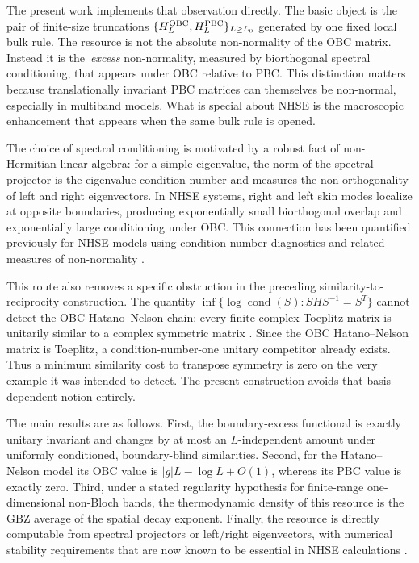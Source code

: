 \documentclass[reprint,amsmath,amssymb,aps,nofootinbib]{revtex4-2}
\newcommand{\cond}{\operatorname{cond}}
\begin{document}
The present work implements that observation directly. The basic object is
the pair of finite-size truncations \(\{H_L^{\rm OBC},H_L^{\rm PBC}\}_{L\ge L_0}\)
generated by one fixed local bulk rule. The resource is not the absolute
non-normality of the OBC matrix. Instead it is the \,\emph{excess}
non-normality, measured by biorthogonal spectral conditioning, that appears
under OBC relative to PBC. This distinction matters because translationally
invariant PBC matrices can themselves be non-normal, especially in
multiband models. What is special about NHSE is the macroscopic enhancement
that appears when the same bulk rule is opened.

The choice of spectral conditioning is motivated by a robust fact of
non-Hermitian linear algebra: for a simple eigenvalue, the norm of the
spectral projector is the eigenvalue condition number and measures the
non-orthogonality of left and right eigenvectors. In NHSE systems, right and
left skin modes localize at opposite boundaries, producing exponentially
small biorthogonal overlap and exponentially large conditioning under OBC.
This connection has been quantified previously for NHSE models using
condition-number diagnostics and related measures of non-normality
\cite{NakaiEtAl2024,FengEtAl2025}.

This route also removes a specific obstruction in the preceding
similarity-to-reciprocity construction. The quantity
\(
\inf\{\log\cond(S):SHS^{-1}=S^T\}
\)
cannot detect the OBC Hatano--Nelson chain: every finite complex Toeplitz
matrix is unitarily similar to a complex symmetric matrix
\cite{ChienLiuNakazatoTam}. Since the OBC Hatano--Nelson matrix is Toeplitz,
a condition-number-one unitary competitor already exists. Thus a minimum
similarity cost to transpose symmetry is zero on the very example it was
intended to detect. The present construction avoids that basis-dependent
notion entirely.

The main results are as follows. First, the boundary-excess functional is
exactly unitary invariant and changes by at most an \(L\)-independent amount
under uniformly conditioned, boundary-blind similarities. Second, for the
Hatano--Nelson model its OBC value is \(|g|L-\log L+O(1)\), whereas its PBC
value is exactly zero. Third, under a stated regularity hypothesis for
finite-range one-dimensional non-Bloch bands, the thermodynamic density of
this resource is the GBZ average of the spatial decay exponent. Finally,
the resource is directly computable from spectral projectors or left/right
eigenvectors, with numerical stability requirements that are now known to
be essential in NHSE calculations \cite{FengEtAl2025}.
\end{document}
